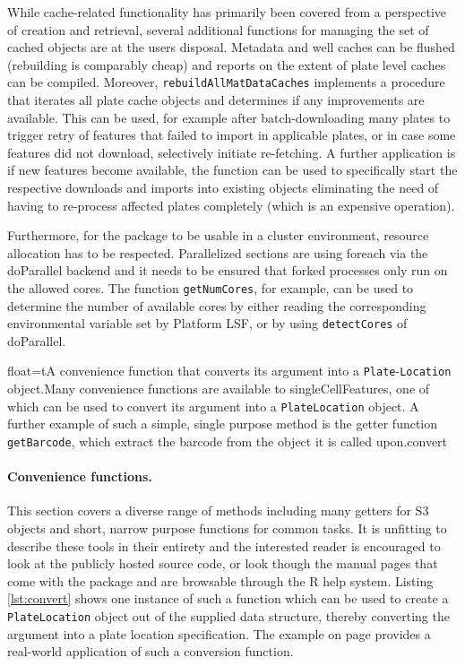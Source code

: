 While cache-related functionality has primarily been covered from a perspective of creation and retrieval, several additional functions for managing the set of cached objects are at the users disposal. Metadata and well caches can be flushed (rebuilding is comparably cheap) and reports on the extent of plate level caches can be compiled. Moreover, \texttt{rebuildAllMatDataCaches} implements a procedure that iterates all plate cache objects and determines if any improvements are available. This can be used, for example after batch-downloading many plates to trigger retry of features that failed to import in applicable plates, or in case some features did not download, selectively initiate re-fetching. A further application is if new features become available, the function can be used to specifically start the respective downloads and imports into existing objects eliminating the need of having to re-process affected plates completely (which is an expensive operation).

Furthermore, for the package to be usable in a cluster environment, resource allocation has to be respected. Parallelized sections are using foreach \citep{Weston2014} via the doParallel backend \citep{Weston2014a} and it needs to be ensured that forked processes only run on the allowed cores. The function \texttt{getNumCores}, for example, can be used to determine the number of available cores by either reading the corresponding environmental variable set by Platform LSF, or by using \texttt{detectCores} of doParallel.

\begin{rlisting}{float=t}{A convenience function that converts its argument into a \texttt{Plate}-\texttt{Location} object.}{Many convenience functions are available to singleCellFeatures, one of which can be used to convert its argument into a \texttt{PlateLocation} object. A further example of such a simple, single purpose method is the getter function \texttt{getBarcode}, which extract the barcode from the object it is called upon.}{convert}

\end{rlisting}

\paragraph{Convenience functions.}
This section covers a diverse range of methods including many getters for S3 objects and short, narrow purpose functions for common tasks. It is unfitting to describe these tools in their entirety and the interested reader is encouraged to look at the publicly hosted source code, or look though the manual pages that come with the package and are browsable through the R help system. Listing \ref{lst:convert} shows one instance of such a function which can be used to create a \texttt{PlateLocation} object out of the supplied data structure, thereby converting the argument into a plate location specification. The example on page \pageref{ex:dataobject-instantiation} provides a real-world application of such a conversion function.


